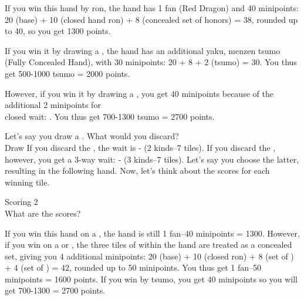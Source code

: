 \bigskip
\noindent If you win this hand by {\jap ron}, the hand has 1 {\jap fan} (Red Dragon) and 40 minipoints: 20 (base) + 10 (closed hand {\jap ron}) + 8 (concealed set of honors) = 38, rounded up to 40, so you get 1300 points. 

\bigskip
If you win it by drawing a {\large{}}, the hand has an additional {\jap yaku}, {\jap menzen tsumo} (Fully Concealed Hand), with 30 minipoints: 20 + 8 + 2 ({\jap tsumo}) = 30. You thus get 500-1000 {\jap tsumo} = 2000 points. 

\bigskip
However, if you win it by drawing a {\large{}}, you get 40 minipoints because of the additional 2 minipoints for \\closed wait: {\large{}}. You thus get 700-1300 {\jap tsumo} = 2700 points.

\bigskip

Let's say you draw a {\large{}}. What would you discard?
\bp
{}\zhong\zhong\zhong~\\
\hspace{290pt}\footnotesize{Draw}
\ep
If you discard the {\large{}}, the wait is {\large{}-} (2 kinds--7 tiles). If you discard the {\large{}}, however, you get a 3-way wait: {\large{}- } (3 kinds--7 tiles). Let's say you choose the latter, resulting in the following hand. Now, let's think about the scores for each winning tile. 

\begin{itembox}[r]{Scoring 2}
\bp
{}\zhong\zhong\zhong\\
\ep
\vspace{-10pt} What are the scores?
\end{itembox}

\bigskip
\noindent If you win this hand on a {\large{}}, the hand is still 1 {\jap fan}--40 minipoints = 1300. However, if you win on a {\large{}} or {\large{}}, the three tiles of {\large{}} within the hand are treated as a concealed set, giving you 4 additional minipoints: 20 (base) + 10 (closed {\jap ron}) + 8 (set of \zhong) + 4 (set of ) = 42, rounded up to 50 minipoints. You thus get 1 {\jap fan}--50 minipoints = 1600 points. If you win by {\jap tsumo}, you get 40 minipoints so you will get 700-1300 = 2700 points. 

\bigskip

